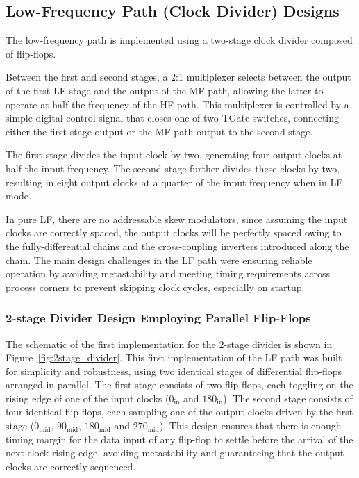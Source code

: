 \subsection{Low-Frequency Path (Clock Divider) Designs}

The low-frequency path is implemented using a two-stage clock divider composed of flip-flops.

Between the first and second stages, a 2:1 multiplexer selects between the output of the first LF stage and the output of the MF path, allowing the latter to operate at half the frequency of the HF path. This multiplexer is controlled by a simple digital control signal that closes one of two TGate switches, connecting either the first stage output or the MF path output to the second stage.

The first stage divides the input clock by two, generating four output clocks at half the input frequency. The second stage further divides these clocks by two, resulting in eight output clocks at a quarter of the input frequency when in LF mode.

In pure LF, there are no addressable skew modulators, since assuming the input clocks are correctly spaced, the output clocks will be perfectly spaced owing to the fully-differential chains and the cross-coupling inverters introduced along the chain. The main design challenges in the LF path were ensuring reliable operation by avoiding metastability and meeting timing requirements across process corners to prevent skipping clock cycles, especially on startup.

\subsubsection{2-stage Divider Design Employing Parallel Flip-Flops}
The schematic of the first implementation for the 2-stage divider is shown in Figure~\ref{fig:2stage_divider}.
This first implementation of the LF path was built for simplicity and robustness, using two identical stages of differential flip-flops arranged in parallel. The first stage consists of two flip-flops, each toggling on the rising edge of one of the input clocks (\(0_{\text{in}}\) and \({180}_{\text{in}}\)). The second stage consists of four identical flip-flops, each sampling one of the output clocks driven by the first stage (\(0_{\text{mid}}\), \(90_{\text{mid}}\), \(180_{\text{mid}}\) and \(270_{\text{mid}}\)). This design ensures that there is enough timing margin for the data input of any flip-flop to settle before the arrival of the next clock rising edge, avoiding metastability and guaranteeing that the output clocks are correctly sequenced. 

